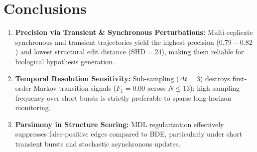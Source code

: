 \documentclass[11pt,a4paper]{article}
\begin{document}
\section{Conclusions}
\begin{enumerate}
    \item \textbf{Precision via Transient \& Synchronous Perturbations:} Multi-replicate synchronous and transient trajectories yield the highest precision ($0.79 - 0.82$) and lowest structural edit distance ($\text{SHD} = 24$), making them reliable for biological hypothesis generation.
    \item \textbf{Temporal Resolution Sensitivity:} Sub-sampling ($\Delta t = 3$) destroys first-order Markov transition signals ($F_1 = 0.00$ across $N \le 13$); high sampling frequency over short bursts is strictly preferable to sparse long-horizon monitoring.
    \item \textbf{Parsimony in Structure Scoring:} MDL regularization effectively suppresses false-positive edges compared to BDE, particularly under short transient bursts and stochastic asynchronous updates.
\end{enumerate}
\end{document}
